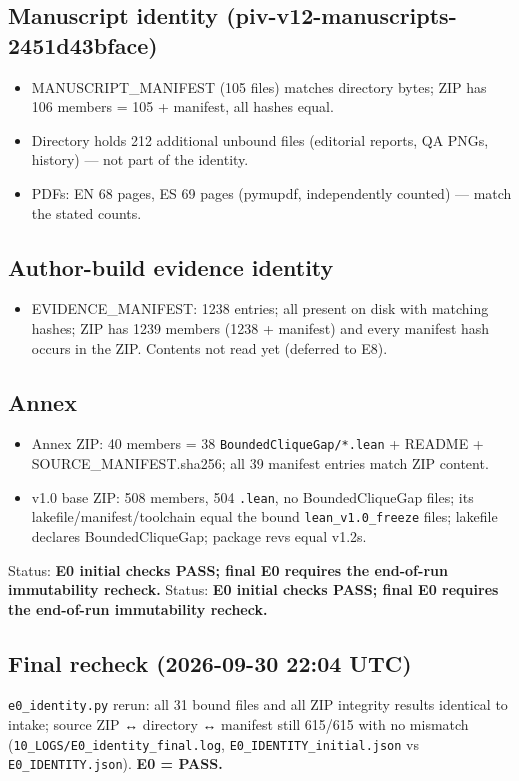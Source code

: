 \documentclass[
]{article}
\providecommand{\tightlist}{%
  \setlength{\itemsep}{0pt}\setlength{\parskip}{0pt}}
\begin{document}
\subsection{Manuscript identity
(piv-v12-manuscripts-2451d43bface)}\label{manuscript-identity-piv-v12-manuscripts-2451d43bface}

\begin{itemize}
\tightlist
\item
  MANUSCRIPT\_MANIFEST (105 files) matches directory bytes; ZIP has 106
  members = 105 + manifest, all hashes equal.
\item
  Directory holds 212 additional unbound files (editorial reports, QA
  PNGs, history) --- not part of the identity.
\item
  PDFs: EN 68 pages, ES 69 pages (pymupdf, independently counted) ---
  match the stated counts.
\end{itemize}

\subsection{Author-build evidence
identity}\label{author-build-evidence-identity}

\begin{itemize}
\tightlist
\item
  EVIDENCE\_MANIFEST: 1238 entries; all present on disk with matching
  hashes; ZIP has 1239 members (1238 + manifest) and every manifest hash
  occurs in the ZIP. Contents not read yet (deferred to E8).
\end{itemize}

\subsection{Annex}\label{annex}

\begin{itemize}
\tightlist
\item
  Annex ZIP: 40 members = 38 \texttt{BoundedCliqueGap/*.lean} + README +
  SOURCE\_MANIFEST.sha256; all 39 manifest entries match ZIP content.
\item
  v1.0 base ZIP: 508 members, 504 \texttt{.lean}, no BoundedCliqueGap
  files; its lakefile/manifest/toolchain equal the bound
  \texttt{lean\_v1.0\_freeze} files; lakefile declares BoundedCliqueGap;
  package revs equal v1.2\textquotesingle s.
\end{itemize}

Status: \textbf{E0 initial checks PASS; final E0 requires the end-of-run
immutability recheck.} Status: \textbf{E0 initial checks PASS; final E0
requires the end-of-run immutability recheck.}

\subsection{Final recheck (2026-09-30 22:04
UTC)}\label{final-recheck-2026-09-30-2204-utc}

\texttt{e0\_identity.py} rerun: all 31 bound files and all ZIP integrity
results identical to intake; source ZIP ↔ directory ↔ manifest still
615/615 with no mismatch (\texttt{10\_LOGS/E0\_identity\_final.log},
\texttt{E0\_IDENTITY\_initial.json} vs \texttt{E0\_IDENTITY.json}).
\textbf{E0 = PASS.}
\end{document}
